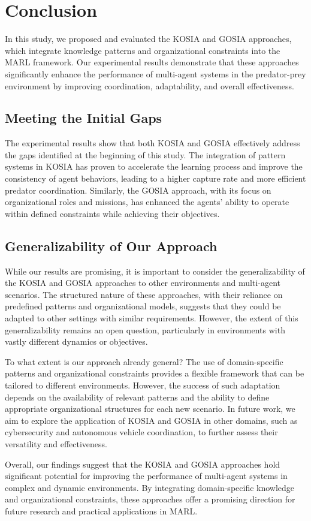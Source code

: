 \documentclass[sn-mathphys-num]{sn-jnl}%
\theoremstyle{thmstyleone}%
\theoremstyle{thmstyletwo}%
\theoremstyle{thmstylethree}%
\begin{document}
\section{Conclusion}\label{sec:conclusion}
In this study, we proposed and evaluated the KOSIA and GOSIA approaches, which integrate knowledge patterns and organizational constraints into the MARL framework. Our experimental results demonstrate that these approaches significantly enhance the performance of multi-agent systems in the predator-prey environment by improving coordination, adaptability, and overall effectiveness.

\subsection{Meeting the Initial Gaps}
The experimental results show that both KOSIA and GOSIA effectively address the gaps identified at the beginning of this study. The integration of pattern systems in KOSIA has proven to accelerate the learning process and improve the consistency of agent behaviors, leading to a higher capture rate and more efficient predator coordination. Similarly, the GOSIA approach, with its focus on organizational roles and missions, has enhanced the agents' ability to operate within defined constraints while achieving their objectives.

\subsection{Generalizability of Our Approach}
While our results are promising, it is important to consider the generalizability of the KOSIA and GOSIA approaches to other environments and multi-agent scenarios. The structured nature of these approaches, with their reliance on predefined patterns and organizational models, suggests that they could be adapted to other settings with similar requirements. However, the extent of this generalizability remains an open question, particularly in environments with vastly different dynamics or objectives.

To what extent is our approach already general? The use of domain-specific patterns and organizational constraints provides a flexible framework that can be tailored to different environments. However, the success of such adaptation depends on the availability of relevant patterns and the ability to define appropriate organizational structures for each new scenario. In future work, we aim to explore the application of KOSIA and GOSIA in other domains, such as cybersecurity and autonomous vehicle coordination, to further assess their versatility and effectiveness.

Overall, our findings suggest that the KOSIA and GOSIA approaches hold significant potential for improving the performance of multi-agent systems in complex and dynamic environments. By integrating domain-specific knowledge and organizational constraints, these approaches offer a promising direction for future research and practical applications in MARL.


\end{document}
